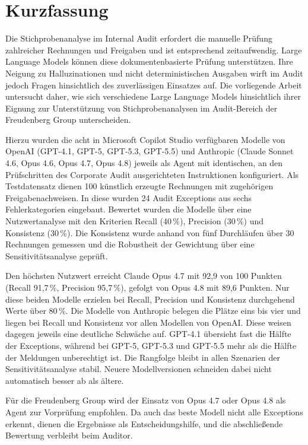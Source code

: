 \chapter*{Kurzfassung}

Die Stichprobenanalyse im Internal Audit erfordert die manuelle Prüfung zahlreicher Rechnungen und Freigaben
und ist entsprechend zeitaufwendig. Large Language Models können diese dokumentenbasierte Prüfung unterstützen.
Ihre Neigung zu Halluzinationen und nicht deterministischen Ausgaben wirft im Audit jedoch Fragen hinsichtlich des zuverlässigen Einsatzes auf.
Die vorliegende Arbeit untersucht daher, wie sich verschiedene Large Language Models hinsichtlich
ihrer Eignung zur Unterstützung von Stichprobenanalysen im Audit-Bereich der Freudenberg Group unterscheiden.

Hierzu wurden die acht in Microsoft Copilot Studio verfügbaren Modelle von OpenAI (GPT-4.1, GPT-5, GPT-5.3, GPT-5.5)
und Anthropic (Claude Sonnet 4.6, Opus 4.6, Opus 4.7, Opus 4.8) jeweils als Agent mit identischen,
an den Prüfschritten des Corporate Audit ausgerichteten Instruktionen konfiguriert. Als Testdatensatz dienen
100 künstlich erzeugte Rechnungen mit zugehörigen Freigabenachweisen. In diese wurden 24 Audit Exceptions aus
sechs Fehlerkategorien eingebaut. Bewertet wurden die Modelle über eine Nutzwertanalyse mit den Kriterien
Recall (40\,\%), Precision (30\,\%) und Konsistenz (30\,\%). Die Konsistenz wurde anhand von fünf Durchläufen
über 30 Rechnungen gemessen und die Robustheit der Gewichtung über eine Sensitivitätsanalyse geprüft.

Den höchsten Nutzwert erreicht Claude Opus 4.7 mit 92,9 von 100 Punkten (Recall 91,7\,\%, Precision 95,7\,\%),
gefolgt von Opus 4.8 mit 89,6 Punkten. Nur diese beiden Modelle erzielen bei Recall, Precision und Konsistenz
durchgehend Werte über 80\,\%. Die Modelle von Anthropic belegen die Plätze eins bis vier und liegen bei Recall
und Konsistenz vor allen Modellen von OpenAI. Diese weisen dagegen jeweils eine deutliche Schwäche auf. GPT-4.1 übersieht
fast die Hälfte der Exceptions, während bei GPT-5, GPT-5.3 und GPT-5.5 mehr als die Hälfte der Meldungen unberechtigt ist.
Die Rangfolge bleibt in allen Szenarien der Sensitivitätsanalyse stabil. Neuere Modellversionen schneiden dabei
nicht automatisch besser ab als ältere.

Für die Freudenberg Group wird der Einsatz von Opus 4.7 oder Opus 4.8 als Agent zur Vorprüfung empfohlen.
Da auch das beste Modell nicht alle Exceptions erkennt, dienen die Ergebnisse als Entscheidungshilfe,
und die abschließende Bewertung verbleibt beim Auditor.
